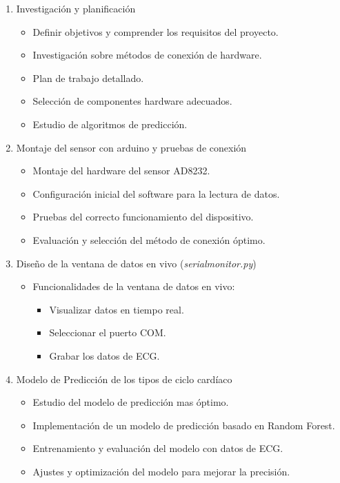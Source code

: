\begin{enumerate}
    \item Investigación y planificación
    \begin{itemize}
        \item Definir objetivos y comprender los requisitos del proyecto.
        \item Investigación sobre métodos de conexión de hardware.
        \item Plan de trabajo detallado.
        \item Selección de componentes hardware adecuados.
        \item Estudio de algoritmos de predicción.
    \end{itemize}

    \item Montaje del sensor con arduino y pruebas de conexión
    \begin{itemize}
        \item Montaje del hardware del sensor AD8232.
        \item Configuración inicial del software para la lectura de datos.
        \item Pruebas del correcto funcionamiento del dispositivo.
        \item Evaluación y selección del método de conexión óptimo.
    \end{itemize}

    \item Diseño de la ventana de datos en vivo (\textit{serialmonitor.py})
\begin{itemize}
    \item Funcionalidades de la ventana de datos en vivo:
        \begin{itemize}
            \item Visualizar datos en tiempo real.
            \item Seleccionar el puerto COM.
            \item Grabar los datos de ECG.
        \end{itemize}
\end{itemize}


    \item Modelo de Predicción de los tipos de ciclo cardíaco
    \begin{itemize}
        \item Estudio del modelo de predicción mas óptimo.
        \item Implementación de un modelo de predicción basado en Random Forest.
        \item Entrenamiento y evaluación del modelo con datos de ECG.
        \item Ajustes y optimización del modelo para mejorar la precisión.
    \end{itemize}


\end{enumerate}
